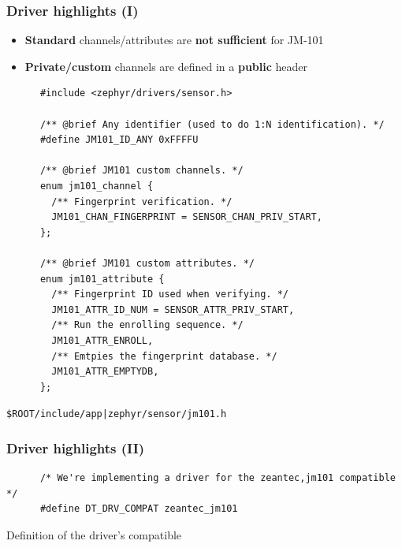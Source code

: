 \documentclass[handout]{beamer}
\begin{document}
\begin{frame}[fragile]
  \frametitle{Driver highlights (I)}

  \begin{itemize}
    \item \textbf{Standard} channels/attributes are \textbf{not sufficient}
          for JM-101
    \item \textbf{Private/custom} channels are defined in a \textbf{public}
          header
  \end{itemize}

  \begin{listing}[H]
    \begin{verbatim}
      #include <zephyr/drivers/sensor.h>

      /** @brief Any identifier (used to do 1:N identification). */
      #define JM101_ID_ANY 0xFFFFU

      /** @brief JM101 custom channels. */
      enum jm101_channel {
        /** Fingerprint verification. */
        JM101_CHAN_FINGERPRINT = SENSOR_CHAN_PRIV_START,
      };

      /** @brief JM101 custom attributes. */
      enum jm101_attribute {
        /** Fingerprint ID used when verifying. */
        JM101_ATTR_ID_NUM = SENSOR_ATTR_PRIV_START,
        /** Run the enrolling sequence. */
        JM101_ATTR_ENROLL,
        /** Emtpies the fingerprint database. */
        JM101_ATTR_EMPTYDB,
      };
    \end{verbatim}
    \caption{\texttt{\$ROOT/include/app|zephyr/sensor/jm101.h}}
  \end{listing}
\end{frame}

\begin{frame}[fragile]
  \frametitle{Driver highlights (II)}

  \begin{listing}[H]
    \begin{verbatim}
      /* We're implementing a driver for the zeantec,jm101 compatible */
      #define DT_DRV_COMPAT zeantec_jm101
    \end{verbatim}
    \caption{Definition of the driver's compatible}
  \end{listing}
\end{frame}
\end{document}
